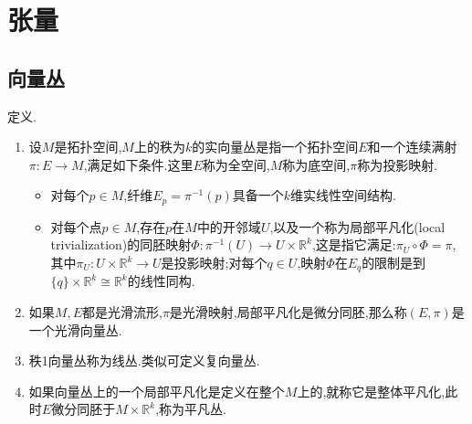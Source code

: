 \newpage
\section{张量}
\subsection{向量丛}

定义.
\begin{enumerate}
	\item 设$M$是拓扑空间,$M$上的秩为$k$的实向量丛是指一个拓扑空间$E$和一个连续满射$\pi:E\to M$,满足如下条件.这里$E$称为全空间,$M$称为底空间,$\pi$称为投影映射.
	\begin{itemize}
		\item 对每个$p\in M$,纤维$E_p=\pi^{-1}(p)$具备一个$k$维实线性空间结构.
		\item 对每个点$p\in M$,存在$p$在$M$中的开邻域$U$,以及一个称为局部平凡化(local trivialization)的同胚映射$\Phi:\pi^{-1}(U)\to U\times\mathbb{R}^k$,这是指它满足:$\pi_U\circ\Phi=\pi$,其中$\pi_U:U\times\mathbb{R}^k\to U$是投影映射;对每个$q\in U$,映射$\Phi$在$E_q$的限制是到$\{q\}\times\mathbb{R}^k\cong\mathbb{R}^k$的线性同构.
	\end{itemize}
    \item 如果$M,E$都是光滑流形,$\pi$是光滑映射,局部平凡化是微分同胚,那么称$(E,\pi)$是一个光滑向量丛.
    \item 秩1向量丛称为线丛.类似可定义复向量丛.
    \item 如果向量丛上的一个局部平凡化是定义在整个$M$上的,就称它是整体平凡化,此时$E$微分同胚于$M\times\mathbb{R}^k$,称为平凡丛.
\end{enumerate}
